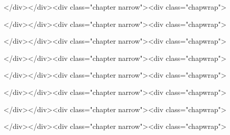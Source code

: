 \documentclass[12pt,a4paper]{book}
\begin{document}
{{{{{{\tableofcontents

\ifdefined\HCode
\else
\listoffigures
\fi

\newpage{}
\hypersetup{linkcolor=LinkGray}
\setcounter{page}{1}

\ifdefined\HCode
\begin{html}
</div></div><div class="chapter narrow"><div class="chapwrap">
\end{html}
\fi



\ifdefined\HCode
\begin{html}
</div></div><div class="chapter narrow"><div class="chapwrap">
\end{html}
\fi



\ifdefined\HCode
\begin{html}
</div></div><div class="chapter narrow"><div class="chapwrap">
\end{html}
\fi



\ifdefined\HCode
\begin{html}
</div></div><div class="chapter narrow"><div class="chapwrap">
\end{html}
\fi



\ifdefined\HCode
\begin{html}
</div></div><div class="chapter narrow"><div class="chapwrap">
\end{html}
\fi



\ifdefined\HCode
\begin{html}
</div></div><div class="chapter narrow"><div class="chapwrap">
\end{html}
\fi



\ifdefined\HCode
\begin{html}
</div></div><div class="chapter narrow"><div class="chapwrap">
\end{html}
\fi



\ifdefined\HCode
\begin{html}
</div></div><div class="chapter narrow"><div class="chapwrap">
\end{html}
\fi



}}}}}}
\end{document}

